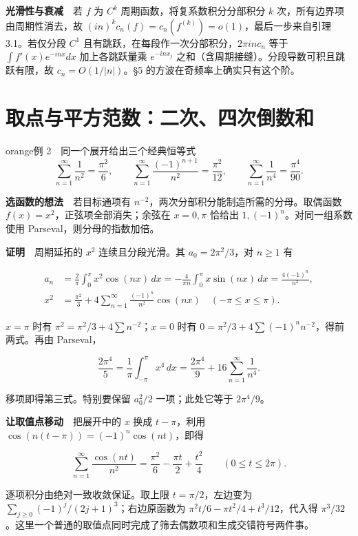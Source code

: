 \documentclass[12pt,a4paper]{article}
\newcommand{\mysection}[1]{\clearpage\section{#1}}
\begin{document}
\textbf{光滑性与衰减}　若 \(f\) 为 \(C^k\) 周期函数，将复系数积分分部积分 \(k\) 次，所有边界项由周期性消去，故 \((in)^kc_n(f)=c_n(f^{(k)})=o(1)\)，最后一步来自引理 3.1。若仅分段 \(C^1\) 且有跳跃，在每段作一次分部积分，\(2\pi i n c_n\) 等于 \(\int f'(x)e^{-inx}dx\) 加上各跳跃量乘 \(e^{-inx_j}\) 之和（含周期接缝）。分段导数可积且跳跃有限，故 \(c_n=O(1/|n|)\)。§5 的方波在奇频率上确实只有这个阶。

\mysection{取点与平方范数：二次、四次倒数和}




\begin{sboxenv}{orange}{例 2　同一个展开给出三个经典恒等式}
\[
\sum_{n=1}^\infty\frac1{n^2}=\frac{\pi^2}{6},\qquad
\sum_{n=1}^\infty\frac{(-1)^{n+1}}{n^2}=\frac{\pi^2}{12},\qquad
\sum_{n=1}^\infty\frac1{n^4}=\frac{\pi^4}{90}.
\]
\end{sboxenv}

\textbf{选函数的想法}　若目标通项有 \(n^{-2}\)，两次分部积分能制造所需的分母。取偶函数 \(f(x)=x^2\)，正弦项全部消失；余弦在 \(x=0,\pi\) 恰给出 \(1,(-1)^n\)。对同一组系数使用 Parseval，则分母的指数加倍。

\textbf{证明}　周期延拓的 \(x^2\) 连续且分段光滑。其 \(a_0=2\pi^2/3\)，对 \(n\ge1\) 有

\[
 \begin{aligned}
 a_n&=\frac2\pi\int_0^\pi x^2\cos(nx)\,dx
 =-\frac4{\pi n}\int_0^\pi x\sin(nx)\,dx
 =\frac{4(-1)^n}{n^2},\\
 x^2&=\frac{\pi^2}{3}+4\sum_{n=1}^{\infty}\frac{(-1)^n}{n^2}\cos(nx)
 \quad(-\pi\le x\le\pi).
 \end{aligned}
\]

\(x=\pi\) 时有 \(\pi^2=\pi^2/3+4\sum n^{-2}\)；\(x=0\) 时有 \(0=\pi^2/3+4\sum(-1)^n n^{-2}\)，得前两式。再由 Parseval，

\[
 \frac{2\pi^4}{5}=\frac1\pi\int_{-\pi}^{\pi}x^4\,dx
 =\frac{2\pi^4}{9}+16\sum_{n=1}^{\infty}\frac1{n^4}.
\]

移项即得第三式。特别要保留 \(a_0^2/2\) 一项；此处它等于 \(2\pi^4/9\)。

\textbf{让取值点移动}　把展开中的 \(x\) 换成 \(t-\pi\)，利用 \(\cos(n(t-\pi))=(-1)^n\cos(nt)\)，即得

\[
 \sum_{n=1}^{\infty}\frac{\cos(nt)}{n^2}
 =\frac{\pi^2}{6}-\frac{\pi t}{2}+\frac{t^2}{4}
 \qquad(0\le t\le2\pi).
\]

逐项积分由绝对一致收敛保证。取上限 \(t=\pi/2\)，左边变为 \(\sum_{j\ge0}(-1)^j/(2j+1)^3\)；右边原函数为 \(\pi^2t/6-\pi t^2/4+t^3/12\)，代入得 \(\pi^3/32\)。这里一个普通的取值点同时完成了筛去偶数项和生成交错符号两件事。
\end{document}
